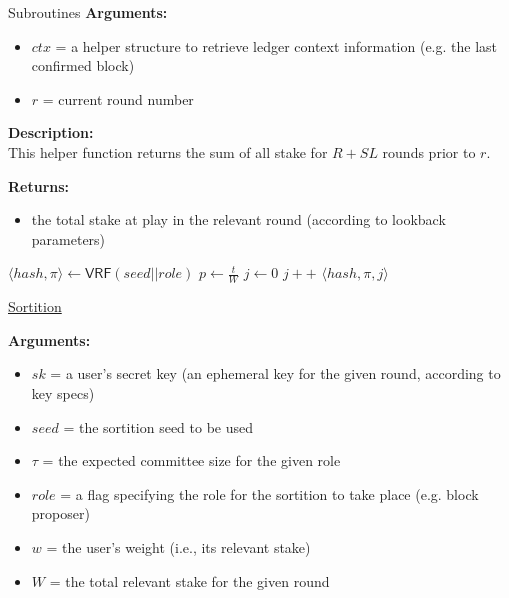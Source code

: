 \documentclass[10pt,a4paper]{article}
\begin{document}
\begin{section}{Subroutines}
\noindent \textbf{Arguments:}
\begin{itemize}
    \item $ctx$ = a helper structure to retrieve ledger context information (e.g. the last confirmed block)
    \item $r$ = current round number
  \end{itemize}


\noindent \textbf{Description:}\\
This helper function returns the sum of all stake for $R + SL$ rounds prior to $r$.

\noindent \textbf{Returns:}
\begin{itemize}
    \item the total stake at play in the relevant round (according to lookback parameters)
  \end{itemize}


\begin{algorithm}[H]
    \begin{algorithmic}[1]
        \State $ \langle hash, \pi \rangle \gets \mathsf{VRF}(seed||role)$
        \State $p \gets \frac{t}{W}$
        \State $j \gets 0$
        \While{$\frac{hash}{2^{hashlen}}\notin [ \sum_{k=0}^j\mathsf{B}(k;w,p), \sum_{k=0}^{j+1}\mathsf{B}(k;w,p))$}
            \State $j++$
        \EndWhile
        \Return $ \langle hash,\pi,j \rangle$
    \EndFunction
    \end{algorithmic}
    \caption{\underline{Sortition}}
\end{algorithm}


\noindent \textbf{Arguments:}
\begin{itemize}
    \item $sk$ = a user's secret key (an ephemeral key for the given round, according to key specs)
    \item $seed$ = the sortition seed to be used
    \item $\tau$ = the expected committee size for the given role
    \item $role$ = a flag specifying the role for the sortition to take place (e.g. block proposer)
    \item $w$ = the user's weight (i.e., its relevant stake)
    \item $W$ = the total relevant stake for the given round
\end{itemize}


\end{section}
\end{document}
